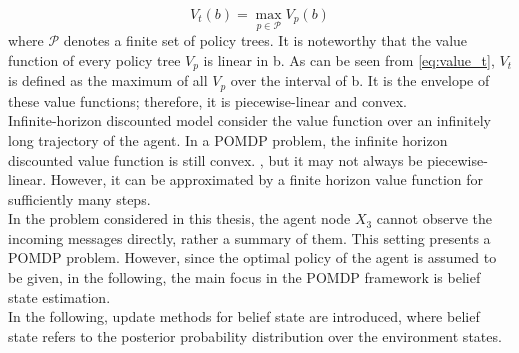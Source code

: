 \begin{equation}
V_{t}(b)=\max _{p \in \mathcal{P}} V_p(b)
\label{eq:value_t}
\end{equation}
where $ \mathcal{P} $ denotes a finite set of policy trees.
It is noteworthy that the value function of every policy tree $ V_p $ is linear in b. As can be seen from \autoref{eq:value_t}, $ V_t $ is defined as the maximum of all $ V_p $ over the interval of b. It is the envelope of these value functions; therefore, it is piecewise-linear and convex.\\
Infinite-horizon discounted model consider the value function over an infinitely long trajectory of the agent. In a POMDP problem, the infinite horizon discounted value function is still convex. \cite{White1980}, but it may not always be piecewise-linear. However, it can be approximated by a finite horizon value function for sufficiently many steps. \cite{Sawaki1978, Edward2019}\\
In the problem considered in this thesis, the agent node $ X_{3} $ cannot observe the incoming messages directly, rather a summary of them. This setting presents a POMDP problem. However, since the optimal policy of the agent is assumed to be given, in the following, the main focus in the POMDP framework is belief state estimation. \\
In the following, update methods for belief state are introduced, where belief state refers to the posterior probability distribution over the environment states.

